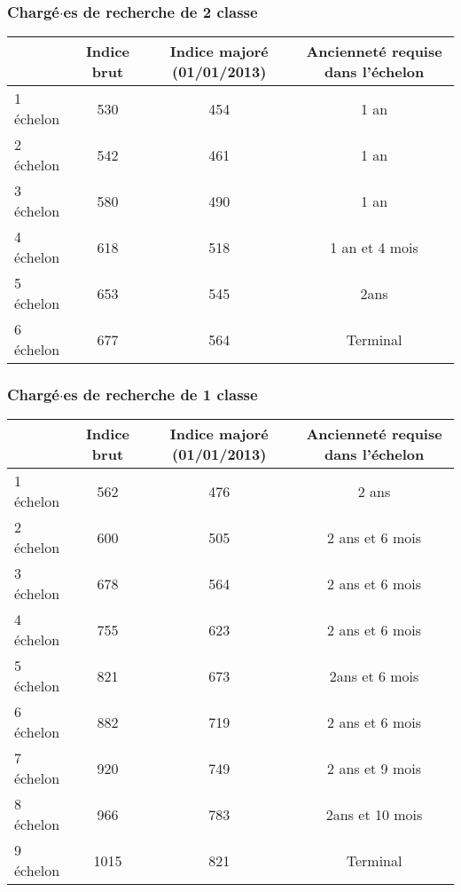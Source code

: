 \subsubsection*{Charg\'e$\cdot$es de recherche de 2\ieme{} classe}
\begin{center}
\begin{tabular}{lccc}
\toprule
& Indice brut& Indice major\'e (01/01/2013)& Anciennet\'e requise dans l'\'echelon \\
\midrule
1\ier{} \'echelon &530&454& 1 an \\

2\ieme{} \'echelon &542&461& 1 an \\

3\ieme{} \'echelon &580&490& 1 an\\

4\ieme{} \'echelon &618&518 &1 an et 4 mois\\

5\ieme{} \'echelon &653&545 & 2ans\\

6\ieme{} \'echelon &677&564&Terminal \\
\bottomrule
\end{tabular}
\end{center}


\subsubsection*{Charg\'e$\cdot$es de recherche de 1\iere{} classe}
\begin{center}
\begin{tabular}{lccc}
\toprule
& Indice brut& Indice major\'e (01/01/2013)& Anciennet\'e requise dans l'\'echelon \\
\midrule
1\ier{} \'echelon &562&476& 2 ans \\

2\ieme{} \'echelon &600&505& 2 ans et 6 mois \\

3\ieme{} \'echelon &678&564& 2 ans et 6 mois\\

4\ieme{} \'echelon &755&623 &2 ans et 6 mois\\

5\ieme{} \'echelon &821&673 & 2ans et 6 mois\\

6\ieme{} \'echelon &882&719& 2 ans et 6 mois\\

7\ieme{} \'echelon &920&749 &2 ans et 9 mois\\

8\ieme{} \'echelon &966&783 & 2ans et 10 mois\\

9\ieme{} \'echelon &1015&821&Terminal \\
\bottomrule
\end{tabular}
\end{center}

